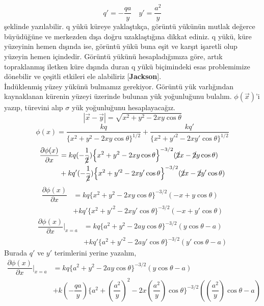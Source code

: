 \begin{theorem}
\[ q'=  - \dfrac{qa}{y} \quad y'= \dfrac{a^{2}}{y} \]
şeklinde yazılabilir. q yükü küreye yaklaştıkça, görüntü yükünün mutlak değerce büyüdüğüne ve merkezden dışa doğru uzaklaştığına dikkat ediniz. q yükü, küre yüzeyinin hemen dışında ise, görüntü yükü buna eşit ve karşıt işaretli olup yüzeyin hemen içindedir. Görüntü yükünü hesapladığımıza göre, artık topraklanmış iletken küre dışında duran q yükü biçimindeki esas problemimize dönebilir ve çeşitli etkileri ele alabiliriz [\textbf{Jackson}]. \\
İndüklenmiş yüzey yükünü bulmamız gerekiyor. Görüntü yük varlığından kaynaklanan kürenin yüzeyi üzerinde bulunan yük yoğunluğunu bulalım. $\phi (\Vec{x})$'i yazıp, türevini alıp $\sigma$ yük yoğunluğunu hesaplayacağız.
\[ |\Vec{x} - \Vec{y}| = \sqrt{x^{2} + y^{2} - 2 xy \cos \theta} \]
\[ \phi (x) = \dfrac{kq}{\bigg\{  x^{2} + y^{2} - 2xy \cos \theta  \bigg\}^{1/2} } + \dfrac{kq'}{\bigg\{  x^{2} + y'^{2} - 2xy' \cos \theta  \bigg\}^{1/2} } \]
\begin{align*}
 \dfrac{\partial \phi (x)}{\partial x} &= kq (-\dfrac{1}{\cancel{2}}) \Big\{ x^{2} + y^{2} - 2xy \cos \theta \Big\}^{-3/2} (\cancel{2}x - \cancel{2}y \cos \theta)\\ 
 &+ k q' (-\dfrac{1}{\cancel{2}})  \Big\{ x^{2} + y'^{2} - 2xy' \cos \theta \Big\}^{-3/2} (\cancel{2}x - \cancel{2}y' \cos \theta)
\end{align*}
\begin{align*}
 \dfrac{\partial \phi (x)}{\partial x} &= kq  \Big\{ x^{2} + y^{2} - 2xy \cos \theta \Big\}^{-3/2} (-x + y \cos \theta)\\ 
 &+ k q'  \Big\{ x^{2} + y'^{2} - 2xy' \cos \theta \Big\}^{-3/2} (-x + y' \cos \theta)
\end{align*}
\newpage
\begin{align*}
 \dfrac{\partial \phi (x)}{\partial x} \Bigg|_{x=a} &= kq \Big\{ a^{2} + y^{2} - 2ay \cos \theta \Big\}^{-3/2} ( y \cos \theta -a )\\ 
 &+ k q' \Big\{ a^{2} + y'^{2} - 2ay' \cos \theta \Big\}^{-3/2} (y' \cos \theta - a)
\end{align*}
Burada $q'$ ve $y'$ terimlerini yerine yazalım,
\begin{align*}
 \dfrac{\partial \phi (x)}{\partial x} \Bigg|_{x=a} &= kq \Big\{ a^{2} + y^{2} - 2ay \cos \theta \Big\}^{-3/2} ( y \cos \theta -a )\\ 
 &+ k ( - \dfrac{qa}{y}) \Big\{ a^{2} + (\dfrac{a^{2}}{y})^{2} - 2x(\dfrac{a^{2}}{y}) \cos \theta \Big\}^{-3/2} ((\dfrac{a^{2}}{y}) \cos \theta - a)
\end{align*}

\end{theorem}
